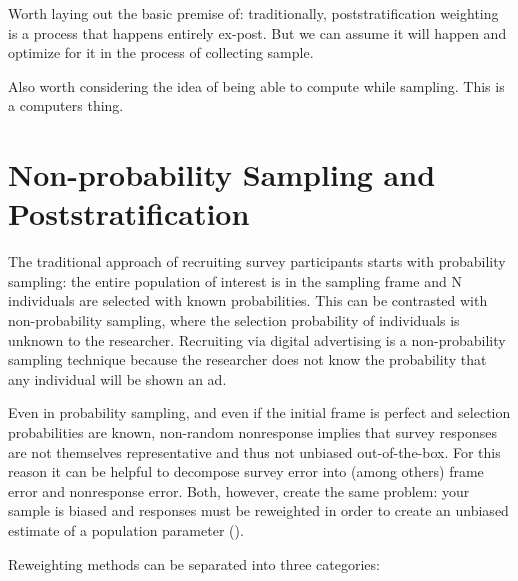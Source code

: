 \message{ !name(survey-sampling-with-ads.tex)}\documentclass[a4paper,12pt]{article}
\theoremstyle{proposition}
\begin{document}
Worth laying out the basic premise of: traditionally, poststratification weighting is a process that happens entirely ex-post. But we can assume it will happen and optimize for it in the process of collecting sample.

Also worth considering the idea of being able to compute while sampling. This is a computers thing.

\section{Non-probability Sampling and Poststratification}


The traditional approach of recruiting survey participants starts with probability sampling: the entire population of interest is in the sampling frame and N individuals are selected with known probabilities. This can be contrasted with non-probability sampling, where the selection probability of individuals is unknown to the researcher. Recruiting via digital advertising is a non-probability sampling technique because the researcher does not know the probability that any individual will be shown an ad.

Even in probability sampling, and even if the initial frame is perfect and selection probabilities are known, non-random nonresponse implies that survey responses are not themselves representative and thus not unbiased out-of-the-box. For this reason it can be helpful to decompose survey error into (among others) frame error and nonresponse error. Both, however, create the same problem: your sample is biased and responses must be reweighted in order to create an unbiased estimate of a population parameter (\cite{Kolenikov2016}).

Reweighting methods can be separated into three categories:
\end{document}
